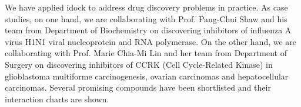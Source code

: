 We have applied idock to address drug discovery problems in practice. As case studies, on one hand, we are collaborating with Prof. Pang-Chui Shaw and his team from Department of Biochemistry on discovering inhibitors of influenza A virus H1N1 viral nucleoprotein and RNA polymerase. On the other hand, we are collaborating with Prof. Marie Chia-Mi Lin and her team from Department of Surgery on discovering inhibitors of CCRK (Cell Cycle-Related Kinase) in glioblastoma multiforme carcinogenesis, ovarian carcinomas and hepatocellular carcinomas. Several promising compounds have been shortlisted and their interaction charts are shown.

\chapterend
